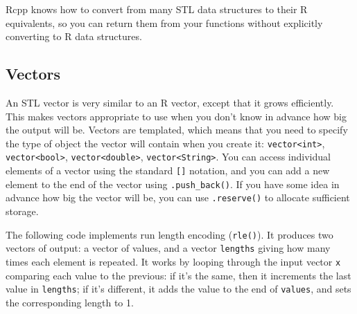 Rcpp knows how to convert from many STL data structures to their R
equivalents, so you can return them from your functions without
explicitly converting to R data structures.

\subsection{Vectors}\label{vectors-stl}

An STL vector is very similar to an R vector, except that it grows
efficiently. This makes vectors appropriate to use when you don't know
in advance how big the output will be. Vectors are templated, which
means that you need to specify the type of object the vector will
contain when you create it: \texttt{vector\textless{}int\textgreater{}},
\texttt{vector\textless{}bool\textgreater{}},
\texttt{vector\textless{}double\textgreater{}},
\texttt{vector\textless{}String\textgreater{}}. You can access
individual elements of a vector using the standard \texttt{{[}{]}}
notation, and you can add a new element to the end of the vector using
\texttt{.push\_back()}. If you have some idea in advance how big the
vector will be, you can use \texttt{.reserve()} to allocate sufficient
storage. 

The following code implements run length encoding (\texttt{rle()}). It
produces two vectors of output: a vector of values, and a vector
\texttt{lengths} giving how many times each element is repeated. It
works by looping through the input vector \texttt{x} comparing each
value to the previous: if it's the same, then it increments the last
value in \texttt{lengths}; if it's different, it adds the value to the
end of \texttt{values}, and sets the corresponding length to 1.

